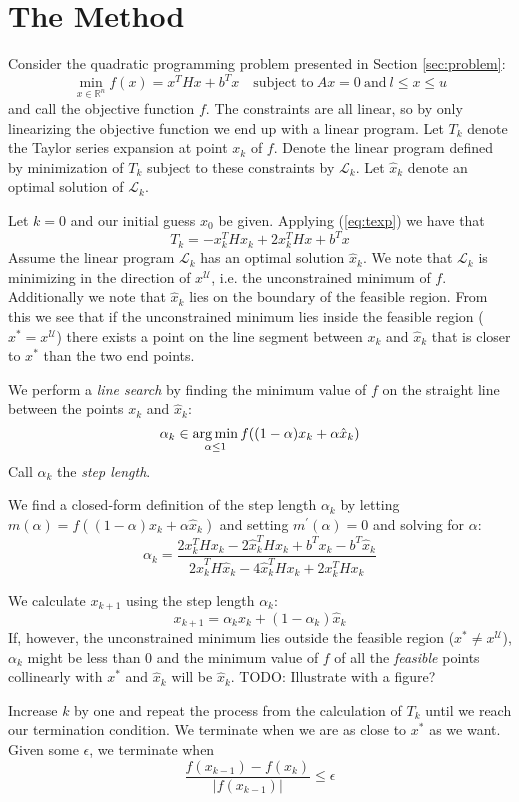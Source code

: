 \section{The Method}
\label{sec:method}
Consider the quadratic programming problem presented in Section
\ref{sec:problem}:
\[
\min_{x \in \mathbb{R}^n} f(x) = x^T H x + b^T x
\quad \textrm{subject to}
~
Ax = 0
~
\textrm{and}
~
l \le x \le u
\]
and call the objective function $f$.
The constraints are all linear, so by only linearizing the objective function
we end up with a linear program.
Let $T_k$ denote the Taylor series expansion at point $x_k$ of $f$.
Denote the linear program defined by minimization of $T_k$ subject to these
constraints by $\mathcal{L}_k$.
Let $\hat{x}_k$ denote an optimal solution of $\mathcal{L}_k$.

Let $k = 0$ and our initial guess $x_0$ be given.
Applying (\ref{eq:texp}) we have that
\[
T_k = - x_k^THx_k + 2x_k^THx + b^Tx
\]
Assume the linear program $\mathcal{L}_k$ has an optimal solution $\hat{x}_k$.
We note that $\mathcal{L}_k$ is minimizing in the direction of
$x^{\mathcal{U}}$, i.e. the unconstrained minimum of $f$.
Additionally we note that $\hat{x}_k$ lies on the boundary of the feasible
region.
From this we see that if the unconstrained minimum lies inside the feasible
region ($x^* = x^\mathcal{U}$) there exists a point on the line segment between
$x_k$ and $\hat{x}_k$ that is closer to $x^*$ than the two end points.

We perform a \emph{line search} by finding the minimum value of $f$ on the
straight line between the points $x_k$ and $\hat{x}_k$:
\[
\alpha_k \in \operatorname*{arg\,min}_{\alpha \leq 1} f((1-\alpha) x_k + \alpha \hat{x}_k)
\]
Call $\alpha_k$ the \emph{step length}.

We find a closed-form definition of the step length $\alpha_k$ by letting
$m(\alpha) = f((1-\alpha) x_k + \alpha \hat{x}_k)$ and setting
$m^\prime(\alpha) = 0$ and solving for $\alpha$:
\[
\alpha_k = \frac{
                2x_k^T H x_k
                - 2\hat{x}_k^T H x_k
                + b^T x_k - b^T \hat{x}_k
                }{
                  2\hat{x}_k^T H \hat{x}_k
                - 4\hat{x}_k^T H x_k
                + 2x_k^T H x_k
                }
\]

We calculate $x_{k+1}$ using the step length $\alpha_k$:
\[
x_{k+1} = \alpha_k x_k + (1-\alpha_k)\hat{x}_k
\]
If, however, the unconstrained minimum lies outside the feasible region
($x^* \neq x^\mathcal{U}$), $\alpha_k$ might be less than $0$ and the minimum
value of $f$ of all the \emph{feasible} points collinearly with $x^*$ and
$\hat{x}_k$ will be $\hat{x}_k$.
TODO: Illustrate with a figure?

Increase $k$ by one and repeat the process from the calculation of $T_k$ until
we reach our termination condition.
We terminate when we are as close to $x^*$ as we want.
Given some $\epsilon$, we terminate when
\[
\frac{f(x_{k-1}) - f(x_k)}{|f(x_{k-1})|} \leq \epsilon
\]


